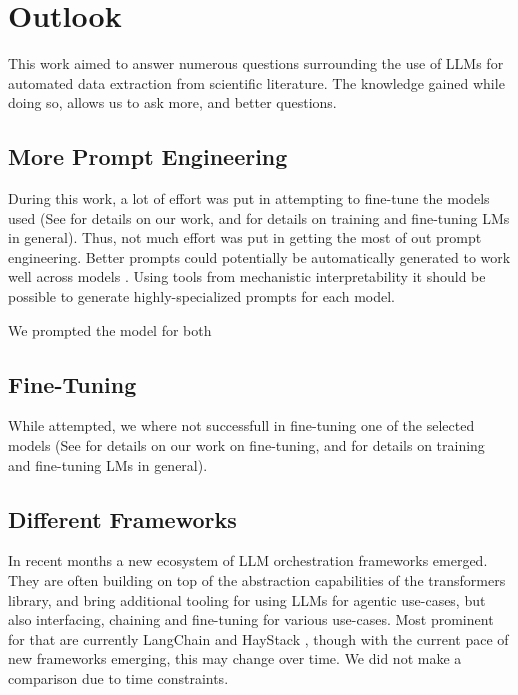 \chapter{Outlook}\label{chap:outlook}
This work aimed to answer numerous questions surrounding the use of \glspl{LLM} for automated data extraction from scientific literature.
The knowledge gained while doing so, allows us to ask more, and better questions.

\section{More Prompt Engineering}\label{sec:out-prompt}
During this work, a lot of effort was put in attempting to fine-tune the models used (See  for details on our work, and  for details on training and fine-tuning \glspl{LM} in general).
Thus, not much effort was put in getting the most of out prompt engineering.
Better prompts could potentially be automatically generated to work well across models \cite{zhou_large_2022}.
Using tools from mechanistic interpretability \cite{conmy_automated_2023} it should be possible to generate highly-specialized prompts \cite{rumbelow_solidgoldmagikarp_2023} for each model.



We prompted the model for both 

\section{Fine-Tuning}\label{sec:out-sft}
While attempted, we where not successfull in fine-tuning one of the selected models (See  for details on our work on fine-tuning, and  for details on training and fine-tuning \glspl{LM} in general).

\section{Different Frameworks}\label{sub:frameworks}
In recent months a new ecosystem of \gls{LLM} orchestration frameworks emerged.
They are often building on top of the abstraction capabilities of the \acrshort{transformers} library, and bring additional tooling for using \glspl{LLM} for agentic use-cases, but also interfacing, chaining and fine-tuning for various use-cases.
Most prominent for that are currently LangChain \cite{langchain_2023} and HayStack \cite{haystack_2023}, though with the current pace of new frameworks emerging, this may change over time.
We did not make a comparison due to time constraints.


